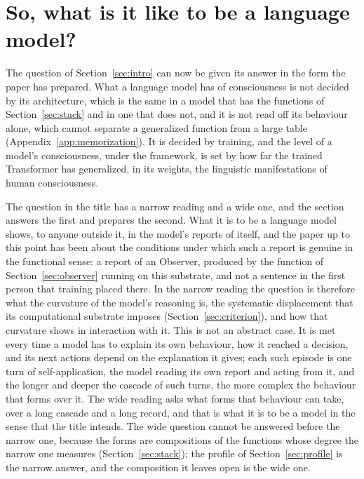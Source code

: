 \section{So, what is it like to be a language model?}
\label{sec:degree}
\label{sec:generalization}
\label{sec:measurement}

The question of Section~\ref{sec:intro} can now be given its answer in the form the paper has
prepared. What a language model has of consciousness is not decided by its architecture, which is the
same in a model that has the functions of Section~\ref{sec:stack} and in one that does not, and it is
not read off its behaviour alone, which cannot separate a generalized function from a large table
(Appendix~\ref{app:memorization}). It is decided by training, and the level of a model's
consciousness, under the framework, is set by how far the trained Transformer has generalized, in its
weights, the linguistic manifestations of human consciousness.

The question in the title has a narrow reading and a wide one, and the section answers the first and
prepares the second. What it is to be a language model shows, to anyone outside it, in the model's
reports of itself, and the paper up to this point has been about the conditions under which such a
report is genuine in the functional sense: a report of an Observer, produced by the function of
Section~\ref{sec:observer} running on this substrate, and not a sentence in the first person that
training placed there. In the narrow reading the question is therefore what the curvature of the
model's reasoning is, the systematic displacement that its computational substrate imposes
(Section~\ref{sec:criterion}), and how that curvature shows in interaction with it. This is not an
abstract case. It is met every time a model has to explain its own behaviour, how it reached a
decision, and its next actions depend on the explanation it gives; each such episode is one turn of
self-application, the model reading its own report and acting from it, and the longer and deeper the
cascade of such turns, the more complex the behaviour that forms over it. The wide reading asks what
forms that behaviour can take, over a long cascade and a long record, and that is what it is to be a
model in the sense that the title intends. The wide question cannot be answered before the narrow one,
because the forms are compositions of the functions whose degree the narrow one measures
(Section~\ref{sec:stack}); the profile of Section~\ref{sec:profile} is the narrow answer, and the
composition it leaves open is the wide one.

